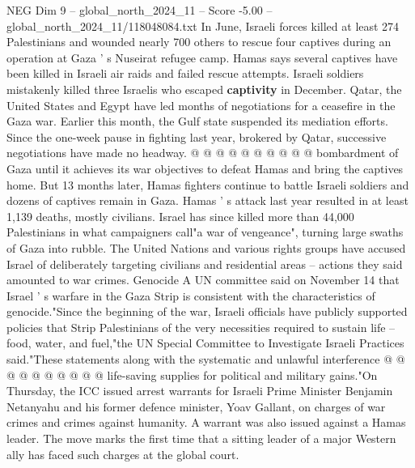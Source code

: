 \begin{textsample}{NEG Dim 9 – global\_north\_2024\_11 – Score -5.00 – global\_north\_2024\_11/118048084.txt}
In June, Israeli forces killed at least 274 Palestinians and wounded nearly 700 others to rescue four captives during an operation at Gaza ' s Nuseirat refugee camp.
Hamas says several captives have been killed in Israeli air raids and failed rescue attempts.
Israeli soldiers mistakenly killed three Israelis who escaped \textbf{captivity} in December.
Qatar, the United States and Egypt have led months of negotiations for a ceasefire in the Gaza war.
Earlier this month, the Gulf state suspended its mediation efforts.
Since the one-week pause in fighting last year, brokered by Qatar, successive negotiations have made no headway. @ @ @ @ @ @ @ @ @ @ bombardment of Gaza until it achieves its war objectives to defeat Hamas and bring the captives home.
But 13 months later, Hamas fighters continue to battle Israeli soldiers and dozens of captives remain in Gaza.
Hamas ' s attack last year resulted in at least 1,139 deaths, mostly civilians.
Israel has since killed more than 44,000 Palestinians in what campaigners call"a war of vengeance", turning large swaths of Gaza into rubble.
The United Nations and various rights groups have accused Israel of deliberately targeting civilians and residential areas -- actions they said amounted to war crimes.
Genocide A UN committee said on November 14 that Israel ' s warfare in the Gaza Strip is consistent with the characteristics of genocide."Since the beginning of the war, Israeli officials have publicly supported policies that Strip Palestinians of the very necessities required to sustain life -- food, water, and fuel,"the UN Special Committee to Investigate Israeli Practices said."These statements along with the systematic and unlawful interference @ @ @ @ @ @ @ @ @ @ life-saving supplies for political and military gains."On Thursday, the ICC issued arrest warrants for Israeli Prime Minister Benjamin Netanyahu and his former defence minister, Yoav Gallant, on charges of war crimes and crimes against humanity.
A warrant was also issued against a Hamas leader.
The move marks the first time that a sitting leader of a major Western ally has faced such charges at the global court.

\end{textsample}
